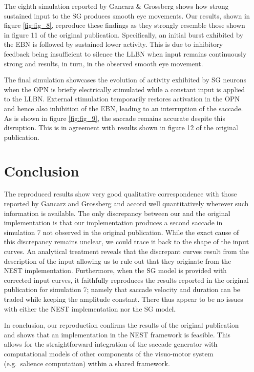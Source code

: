 \documentclass[10pt,a4paper,onecolumn]{article}
\begin{document}
The eighth simulation reported by Gancarz \& Grossberg
\autocite{Gancarz1998} shows how strong sustained input to the SG
produces smooth eye movements. Our results, shown in figure
\ref{fig:fig_8}, reproduce these findings as they strongly resemble
those shown in figure 11 of the original publication. Specifically, an
initial burst exhibited by the EBN is followed by sustained lower
activity. This is due to inhibitory feedback being insufficient to
silence the LLBN when input remains continuously strong and results, in
turn, in the observed smooth eye movement.

The final simulation showcases the evolution of activity exhibited by SG
neurons when the OPN is briefly electrically stimulated while a constant
input is applied to the LLBN. External stimulation temporarily restores
activation in the OPN and hence also inhibition of the EBN, leading to
an interruption of the saccade. As is shown in figure \ref{fig:fig_9},
the saccade remains accurate despite this disruption. This is in
agreement with results shown in figure 12 of the original publication.

\hypertarget{conclusion}{%
\section{Conclusion}\label{conclusion}}

The reproduced results show very good qualitative correspondence with
those reported by Gancarz and Grossberg \autocite{Gancarz1998} and
accord well quantitatively wherever such information is available. The
only discrepancy between our and the original implementation is that our
implementation produces a second saccade in simulation 7 not observed in
the original publication. While the exact cause of this discrepancy
remains unclear, we could trace it back to the shape of the input
curves. An analytical treatment reveals that the discrepant curves
result from the description of the input allowing us to rule out that
they originate from the NEST implementation. Furthermore, when the SG
model is provided with corrected input curves, it faithfully reproduces
the results reported in the original publication for simulation 7;
namely that saccade velocity and duration can be traded while keeping
the amplitude constant. There thus appear to be no issues with either
the NEST implementation nor the SG model.

In conclusion, our reproduction confirms the results of the original
publication and shows that an implementation in the NEST framework is
feasible. This allows for the straightforward integration of the saccade
generator with computational models of other components of the
visuo-motor system (e.g.~salience computation) within a shared
framework.
\end{document}
